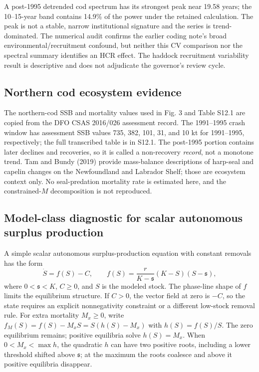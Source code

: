 A post-1995 detrended cod spectrum has its strongest peak near 19.58 years; the 10--15-year band contains 14.9\% of the power under the retained calculation. The peak is not a stable, narrow institutional signature and the series is trend-dominated. The numerical audit confirms the earlier coding note's broad environmental/recruitment confound, but neither this CV comparison nor the spectral summary identifies an HCR effect. The haddock recruitment variability result is descriptive and does not adjudicate the governor's review cycle.

\subsection{Northern cod ecosystem evidence}

The northern-cod SSB and mortality values used in Fig. 3 and Table S12.1 are copied from the DFO CSAS 2016/026 assessment record. The 1991--1995 crash window has assessment SSB values 735, 382, 101, 31, and 10 kt for 1991--1995, respectively; the full transcribed table is in S12.1. The post-1995 portion contains later declines and recoveries, so it is called a non-recovery \emph{record}, not a monotone trend. Tam and Bundy (2019) provide mass-balance descriptions of harp-seal and capelin changes on the Newfoundland and Labrador Shelf; those are ecosystem context only. No seal-predation mortality rate is estimated here, and the constrained-\(M\) decomposition is not reproduced.

\subsection{Model-class diagnostic for scalar autonomous surplus production}

A simple scalar autonomous surplus-production equation with constant removals has the form
\[
\dot S=f(S)-C,\qquad f(S)=\frac{r}{K-\mathfrak s}(K-S)(S-\mathfrak s),
\]
where \(0<\mathfrak s<K\), \(C\geq0\), and \(S\) is the modeled stock. The phase-line shape of \(f\) limits the equilibrium structure. If \(C>0\), the vector field at zero is \(-C\), so the state requires an explicit nonnegativity constraint or a different low-stock removal rule. For extra mortality \(M_x\geq0\), write \(f_M(S)=f(S)-M_xS=S(h(S)-M_x)\) with \(h(S)=f(S)/S\). The zero equilibrium remains; positive equilibria solve \(h(S)=M_x\). When \(0<M_x<\max h\), the quadratic \(h\) can have two positive roots, including a lower threshold shifted above \(\mathfrak s\); at the maximum the roots coalesce and above it positive equilibria disappear.

